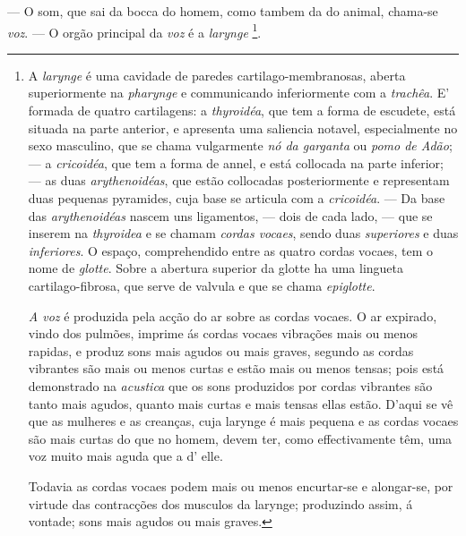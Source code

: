 --- O som, que sai da bocca do homem, como tambem da do animal, chama-se \emph{voz}. --- O orgão principal da \emph{voz} é a \emph{larynge} \footnote{A \emph{larynge} é uma cavidade de paredes cartilago-membranosas, aberta superiormente na \emph{pharynge} e communicando inferiormente com a \emph{trachêa}. E' formada de quatro cartilagens: a \emph{thyroidéa}, que tem a forma de escudete, está situada na parte anterior, e apresenta uma saliencia notavel, especialmente no sexo masculino, que se chama vulgarmente \emph{nó da garganta} ou \emph{pomo de Adão}; --- a \emph{cricoidéa}, que tem a forma de annel, e está collocada na parte inferior; --- as duas \emph{arythenoidéas}, que estão collocadas posteriormente e representam duas pequenas pyramides, cuja base se articula com a \emph{cricoidéa}. --- Da base das \emph{arythenoidéas} nascem uns ligamentos, --- dois de cada lado, --- que se inserem na \emph{thyroidea} e se chamam \emph{cordas vocaes}, sendo duas \emph{superiores} e duas \emph{inferiores}. O espaço, comprehendido entre as quatro cordas vocaes, tem o nome de \emph{glotte}. Sobre a abertura superior da glotte ha uma lingueta cartilago-fibrosa, que serve de valvula e que se chama \emph{epiglotte}.\par \emph{A voz} é produzida pela acção do ar sobre as cordas vocaes. O ar expirado, vindo dos pulmões, imprime ás cordas vocaes vibrações mais ou menos rapidas, e produz sons mais agudos ou mais graves, segundo as cordas vibrantes são mais ou menos curtas e estão mais ou menos tensas; pois está demonstrado na \emph{acustica} que os sons produzidos por cordas vibrantes são tanto mais agudos, quanto mais curtas e mais tensas ellas estão. D'aqui se vê que as mulheres e as creanças, cuja larynge é mais pequena e as cordas vocaes são mais curtas do que no homem, devem ter, como effectivamente têm, uma voz muito mais aguda que a d' elle.\par Todavia as cordas vocaes podem mais ou menos encurtar-se e alongar-se, por virtude das contracções dos musculos da larynge; produzindo assim, á vontade; sons mais agudos ou mais graves.}.


